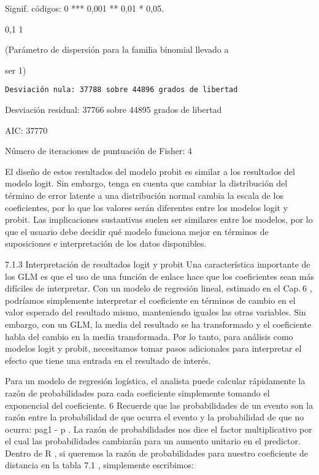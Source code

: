 \documentclass[
]{book}
\begin{document}
Signif. códigos: 0 *** 0,001 ** 0,01 * 0,05.

0,1 1

(Parámetro de dispersión para la familia binomial llevado a

ser 1)

\begin{verbatim}
Desviación nula: 37788 sobre 44896 grados de libertad
\end{verbatim}

Desviación residual: 37766 sobre 44895 grados de libertad

AIC: 37770

Número de iteraciones de puntuación de Fisher: 4

El diseño de estos resultados del modelo probit es similar a los resultados del modelo logit. Sin embargo, tenga en cuenta que cambiar la distribución del término de error latente a una distribución normal cambia la escala de los coeficientes, por lo que los valores serán diferentes entre los modelos logit y probit. Las implicaciones sustantivas suelen ser similares entre los modelos, por lo que el usuario debe decidir qué modelo funciona mejor en términos de suposiciones e interpretación de los datos disponibles.

7.1.3 Interpretación de resultados logit y probit
Una característica importante de los GLM es que el uso de una función de enlace hace que los coeficientes sean más difíciles de interpretar. Con un modelo de regresión lineal, estimado en el Cap. 6 , podríamos simplemente interpretar el coeficiente en términos de cambio en el valor esperado del resultado mismo, manteniendo iguales las otras variables. Sin embargo, con un GLM, la media del resultado se ha transformado y el coeficiente habla del cambio en la media transformada. Por lo tanto, para análisis como modelos logit y probit, necesitamos tomar pasos adicionales para interpretar el efecto que tiene una entrada en el resultado de interés.

Para un modelo de regresión logística, el analista puede calcular rápidamente la razón de probabilidades para cada coeficiente simplemente tomando el exponencial del coeficiente. 6 Recuerde que las probabilidades de un evento son la razón entre la probabilidad de que ocurra el evento y la probabilidad de que no ocurra: pag1 - p . La razón de probabilidades nos dice el factor multiplicativo por el cual las probabilidades cambiarán para un aumento unitario en el predictor. Dentro de R , si queremos la razón de probabilidades para nuestro coeficiente de distancia en la tabla 7.1 , simplemente escribimos:
\end{document}
